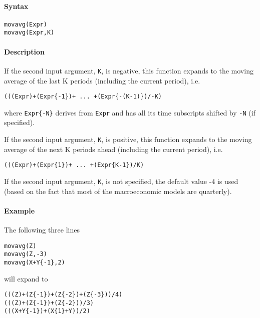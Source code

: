 


	\paragraph{Syntax}\label{syntax}

\begin{verbatim}
movavg(Expr)
movavg(Expr,K)
\end{verbatim}

\paragraph{Description}\label{description}

If the second input argument, \texttt{K}, is negative, this function
expands to the moving average of the last K periods (including the
current period), i.e.

\begin{verbatim}
(((Expr)+(Expr{-1})+ ... +(Expr{-(K-1)})/-K)
\end{verbatim}

where \texttt{Expr\{-N\}} derives from \texttt{Expr} and has all its
time subscripts shifted by \texttt{-N} (if specified).

If the second input argument, \texttt{K}, is positive, this function
expands to the moving average of the next K periods ahead (including the
current period), i.e.

\begin{verbatim}
(((Expr)+(Expr{1})+ ... +(Expr{K-1})/K)
\end{verbatim}

If the second input argument, \texttt{K}, is not specified, the default
value -4 is used (based on the fact that most of the macroeconomic
models are quarterly).

\paragraph{Example}\label{example}

The following three lines

\begin{verbatim}
movavg(Z)
movavg(Z,-3)
movavg(X+Y{-1},2)
\end{verbatim}

will expand to

\begin{verbatim}
(((Z)+(Z{-1})+(Z{-2})+(Z{-3}))/4)
(((Z)+(Z{-1})+(Z{-2}))/3)
(((X+Y{-1})+(X{1}+Y))/2)
\end{verbatim}


